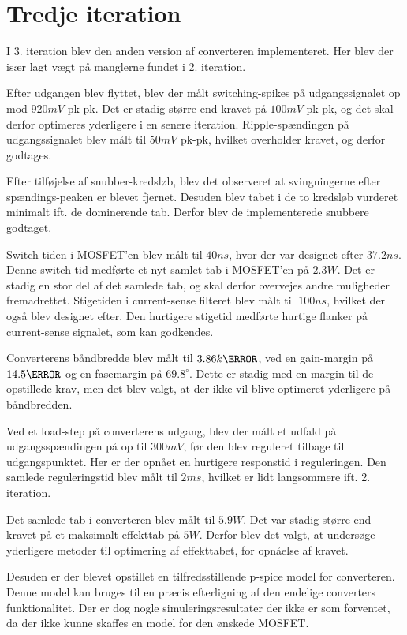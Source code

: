 
\section{Tredje iteration}
I 3. iteration blev den anden version af converteren implementeret. Her blev der især lagt vægt på manglerne fundet i 2. iteration. 

Efter udgangen blev flyttet, blev der målt switching-spikes på udgangssignalet op mod $920mV$ pk-pk. Det er stadig større end kravet på $100mV$ pk-pk, og det skal derfor optimeres yderligere i en senere iteration. Ripple-spændingen på udgangssignalet blev målt til $50mV$ pk-pk, hvilket overholder kravet, og derfor godtages.

Efter tilføjelse af snubber-kredsløb, blev det observeret at svingningerne efter spændings-peaken er blevet fjernet. Desuden blev tabet i de to kredsløb vurderet minimalt ift. de dominerende tab. Derfor blev de implementerede snubbere godtaget.

Switch-tiden i MOSFET'en blev målt til $40ns$, hvor der var designet efter $37.2ns$. Denne switch tid medførte et nyt samlet tab i MOSFET'en på $2.3W$. Det er stadig en stor del af det samlede tab, og skal derfor overvejes andre muligheder fremadrettet. Stigetiden i current-sense filteret blev målt til $100ns$, hvilket der også blev designet efter. Den hurtigere stigetid medførte hurtige flanker på current-sense signalet, som kan godkendes.

Converterens båndbredde blev målt til $3.86k\hertz$, ved en gain-margin på $14.5\decibel$ og en fasemargin på $69.8^\circ$. Dette er stadig med en margin til de opstillede krav, men det blev valgt, at der ikke vil blive optimeret yderligere på båndbredden. 

Ved et load-step på converterens udgang, blev der målt et udfald på udgangsspændingen på op til $300mV$, før den blev reguleret tilbage til udgangspunktet. Her er der opnået en hurtigere responstid i reguleringen. Den samlede reguleringstid blev målt til $2ms$, hvilket er lidt langsommere ift. 2. iteration. 

Det samlede tab i converteren blev målt til $5.9W$. Det var stadig større end kravet på et maksimalt effekttab på $5W$. Derfor blev det valgt, at undersøge yderligere metoder til optimering af effekttabet, for opnåelse af kravet. 

Desuden er der blevet opstillet en tilfredsstillende p-spice model for converteren. Denne model kan bruges til en præcis efterligning af den endelige converters funktionalitet. Der er dog nogle simuleringsresultater der ikke er som forventet, da der ikke kunne skaffes en model for den ønskede MOSFET. 

